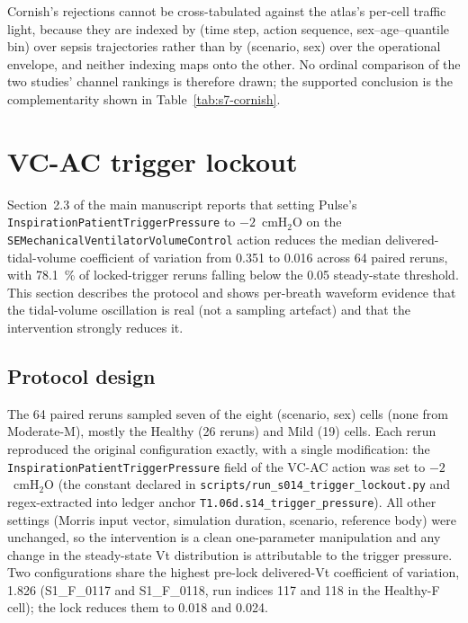 \documentclass[pdflatex,sn-nature]{sn-jnl}%
\newcommand{\mainref}[2]{#2}
\begin{document}
Cornish's rejections cannot be cross-tabulated against the atlas's per-cell traffic light, because they are indexed by (time step, action sequence, sex--age--quantile bin) over sepsis trajectories rather than by (scenario, sex) over the operational envelope, and neither indexing maps onto the other. No ordinal comparison of the two studies' channel rankings is therefore drawn; the supported conclusion is the complementarity shown in Table~\ref{tab:s7-cornish}.



\section{VC-AC trigger lockout}\label{sec:s8}

Section~\mainref{sec:results-vcac}{2.3} of the main manuscript reports that setting Pulse's \texttt{InspirationPatientTriggerPressure} to $-2$~cmH$_2$O on the \texttt{SEMechanicalVentilatorVolumeControl} action reduces the median delivered-tidal-volume coefficient of variation from 0.351 to 0.016 across 64 paired reruns, with 78.1~\% of locked-trigger reruns falling below the 0.05 steady-state threshold. This section describes the protocol and shows per-breath waveform evidence that the tidal-volume oscillation is real (not a sampling artefact) and that the intervention strongly reduces it.

\subsection{Protocol design}\label{sec:s8-protocol}

The 64 paired reruns sampled seven of the eight (scenario, sex) cells (none from Moderate-M), mostly the Healthy (26 reruns) and Mild (19) cells. Each rerun reproduced the original configuration exactly, with a single modification: the \texttt{InspirationPatientTriggerPressure} field of the VC-AC action was set to $-2$~cmH$_2$O (the constant declared in \texttt{scripts/run\_s014\_trigger\_lockout.py} and regex-extracted into ledger anchor \texttt{T1.06d.s14\_trigger\_pressure}). All other settings (Morris input vector, simulation duration, scenario, reference body) were unchanged, so the intervention is a clean one-parameter manipulation and any change in the steady-state Vt distribution is attributable to the trigger pressure. Two configurations share the highest pre-lock delivered-Vt coefficient of variation, 1.826 (S1\_F\_0117 and S1\_F\_0118, run indices 117 and 118 in the Healthy-F cell); the lock reduces them to 0.018 and 0.024.
\end{document}
